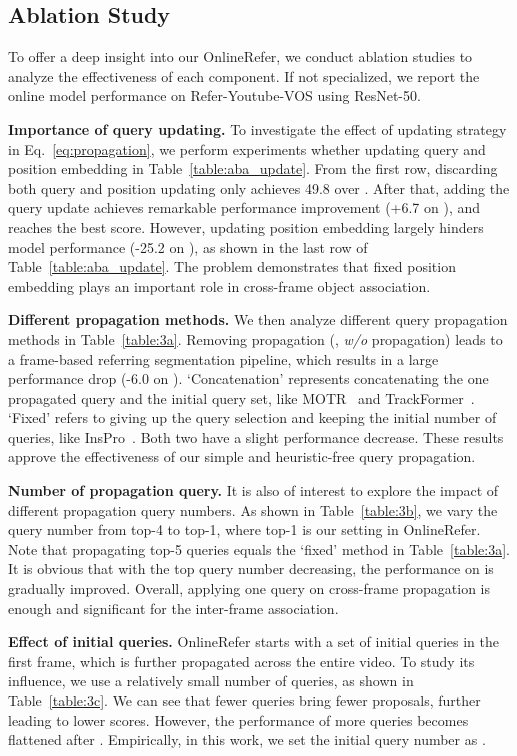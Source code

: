 \documentclass[10pt,twocolumn,letterpaper]{article}
\begin{document}
\subsection{Ablation Study}
\label{sec:ablation}

To offer a deep insight into our OnlineRefer, we conduct ablation studies to analyze the effectiveness of each component.
If not specialized, we report the online model performance on Refer-Youtube-VOS using ResNet-50.

\noindent\textbf{Importance of query updating.}
To investigate the effect of updating strategy in Eq.~\ref{eq:propagation}, we perform experiments whether updating query and position embedding in Table~\ref{table:aba_update}.
From the first row, discarding  both query and position updating only  achieves 49.8 over .
After that, adding the query update achieves remarkable performance improvement (+6.7 on ), and reaches the best score.
However, updating position embedding largely hinders model performance (-25.2 on ), as shown in the last row of  Table~\ref{table:aba_update}.
The problem demonstrates that fixed position embedding plays an important role in cross-frame object association.

\noindent\textbf{Different propagation methods.}
We then analyze different query propagation methods in Table~\ref{table:3a}.
Removing propagation (\ie, \textit{w/o} propagation) leads to a frame-based referring segmentation pipeline, which results in a large performance drop (-6.0 on ).
`Concatenation' represents concatenating the one propagated query and the initial query set, like MOTR~\cite{motr} and TrackFormer~\cite{trackformer}.
`Fixed' refers to giving up the query selection and keeping the initial number of queries, like InsPro~\cite{inspro}.
Both two have a slight performance decrease.
These results approve the effectiveness of our simple and heuristic-free
query propagation.

\noindent\textbf{Number of propagation query.}
It is also of interest to explore the impact of different propagation query numbers.
As shown in Table~\ref{table:3b}, we vary the query number from top-4 to top-1, where top-1 is our setting in OnlineRefer.
Note that propagating top-5 queries equals the `fixed' method in Table~\ref{table:3a}.
It is obvious that with the top query number decreasing, the performance on  is gradually improved.
Overall, applying one query on cross-frame propagation is enough and significant  for the inter-frame association.

\noindent\textbf{Effect of initial queries.}
OnlineRefer starts with a set of initial queries in the first frame, which is further propagated across the entire video.
To study its influence, we use a relatively small number of queries, as shown in Table~\ref{table:3c}.
We can see that fewer queries bring fewer proposals, further leading to lower  scores.
However, the performance of more queries becomes flattened after .
Empirically, in this work, we set the initial query number as .
\end{document}
